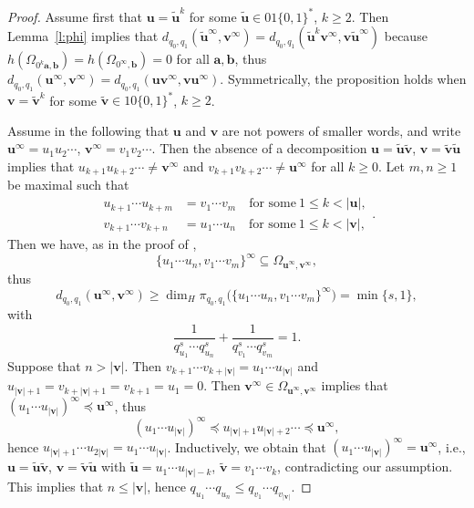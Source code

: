 \documentclass{amsart}
\theoremstyle{definition}
\numberwithin{equation}{section}
\newcommand{\ba}{\mathbf{a}}
\newcommand{\bb}{\mathbf{b}}
\newcommand{\bu}{\mathbf{u}}
\newcommand{\bv}{\mathbf{v}}
\begin{document}
\begin{proof}
Assume first that $\bu = \tilde{\bu}^k$ for some $\tilde{\bu} \in 01\{0,1\}^*$, $k \ge 2$.
Then Lemma~\ref{l:phi} implies that $d_{q_0,q_1}(\tilde{\bu}^\infty,\bv^\infty) = d_{q_0,q_1}(\tilde{\bu}^k\bv^\infty,\bv\tilde{\bu}^\infty)$ because $h(\Omega_{0^k\ba,\bb}) = h(\Omega_{0^\infty,\bb}) = 0$ for all $\ba,\bb$, thus $d_{q_0,q_1}(\bu^\infty,\bv^\infty) = d_{q_0,q_1}(\bu\bv^\infty,\bv\bu^\infty)$.
Symmetrically, the proposition holds when $\bv = \tilde{\bv}^k$ for some $\tilde{\bv} \in 10\{0,1\}^*$, $k \ge 2$.

Assume in the following that $\bu$ and $\bv$ are not powers of smaller words, and write $\bu^\infty = u_1 u_2 \cdots$, $\bv^\infty = v_1 v_2 \cdots$.
Then the absence of a decomposition $\bu = \tilde{\bu}\tilde{\bv}$, $\bv = \tilde{\bv}\tilde{\bu}$ implies that $u_{k+1} u_{k+2} \cdots \ne \bv^\infty$ and $v_{k+1} v_{k+2} \cdots \ne \bu^\infty$ for all $k \ge 0$.
Let $m,n \ge 1$ be maximal such that 
\[
\begin{aligned}
u_{k+1} \cdots u_{k+m} & = v_1 \cdots v_m \quad \mbox{for some}\ 1 \le k < |\bu|, \\
 v_{k+1} \cdots v_{k+n} & = u_1 \cdots u_n \quad \mbox{for some}\ 1 \le k < |\bv|,
\end{aligned}.
\]
Then we have, as in the proof of \cite[Lemma~8]{BarSteVin2014},
\[
\{u_1\cdots u_n,v_1 \cdots v_m\}^\infty \subseteq \Omega_{\bu^\infty,\bv^\infty},
\]
thus 
\begin{equation} \label{e:dimuv}
d_{q_0,q_1}(\bu^\infty,\bv^\infty) \ge \dim_H \pi_{q_0,q_1}\big(\{u_1\cdots u_n,v_1\cdots v_m\}^\infty\big) = \min\{s,1\}, 
\end{equation}
with
\[
\frac{1}{q_{u_1}^s\cdots q_{u_n}^s} + \frac{1}{q_{v_1}^s\cdots q_{v_m}^s} = 1.
\]
Suppose that $n > |\bv|$.
Then $v_{k+1} \cdots v_{k+|\bv|} = u_1 \cdots u_{|\bv|}$ and $u_{|\bv|+1}  = v_{k+|\bv|+1} = v_{k+1} = u_1 = 0$. 
Then $\bv^\infty \in \Omega_{\bu^\infty,\bv^\infty}$ implies that $(u_1 \cdots u_{|\bv|})^\infty \preceq \bu^\infty$, thus
\[
(u_1 \cdots u_{|\bv|})^\infty \preceq u_{|\bv|+1} u_{|\bv|+2} \cdots \preceq \bu^\infty,
\]
hence $u_{|\bv|+1} \cdots u_{2|\bv|} = u_1 \cdots u_{|\bv|}$.
Inductively, we obtain that $(u_1 \cdots u_{|\bv|})^\infty = \bu^\infty$, i.e., $\bu = \tilde{\bu} \tilde{\bv}$, $\bv = \tilde{\bv} \tilde{\bu}$ with $\tilde{\bu} = u_1 \cdots u_{|\bv|-k}$, $\tilde{\bv} = v_1 \cdots v_k$, contradicting our assumption.
This implies that $n \le |\bv|$, hence $q_{u_1} \cdots q_{u_n} \le q_{v_1} \cdots q_{v_{|\bv|}}$.

\end{proof}
\end{document}
